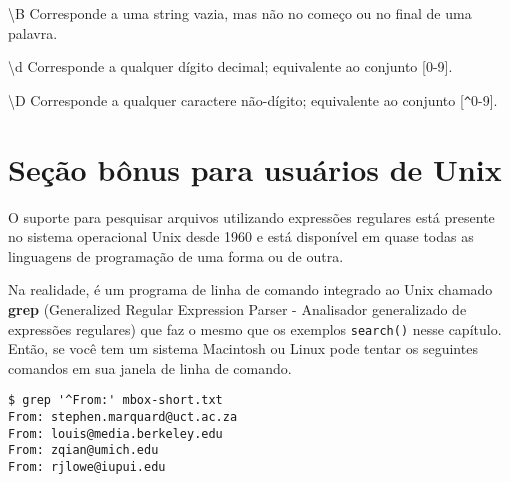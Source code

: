 {\textbackslash}B \newline
Corresponde a uma string vazia, mas não no começo ou no final de uma palavra.

{\textbackslash}d \newline
Corresponde a qualquer dígito decimal; equivalente ao conjunto [0-9].

{\textbackslash}D \newline
Corresponde a qualquer caractere não-dígito; equivalente ao conjunto [\verb"^"0-9].

\section{Seção bônus para usuários de Unix}

O suporte para pesquisar arquivos utilizando expressões regulares está
presente no sistema operacional Unix desde 1960 e está disponível em quase
todas as linguagens de programação de uma forma ou de outra.

Na realidade, é um programa de linha de comando integrado ao Unix chamado
{\bf grep} (Generalized Regular Expression Parser - Analisador generalizado
de expressões regulares) que faz o mesmo que os exemplos {\tt search()} nesse
capítulo. Então, se você tem um sistema Macintosh ou Linux pode tentar os
seguintes comandos em sua janela de linha de comando. 

\beforeverb
\begin{verbatim}
$ grep '^From:' mbox-short.txt
From: stephen.marquard@uct.ac.za
From: louis@media.berkeley.edu
From: zqian@umich.edu
From: rjlowe@iupui.edu
\end{verbatim}
\afterverb
%

